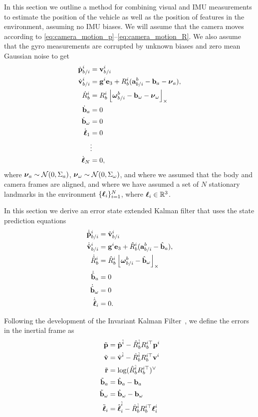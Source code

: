 In this section we outline a method for combining visual and IMU measurements to estimate the position of the vehicle as well as the position of features in the environment, assuming no IMU biases.  We will assume that the camera moves according to \eqref{eq:camera_motion_p}--\eqref{eq:camera_motion_R}.  We also assume that the gyro measurements are corrupted by unknown biases and zero mean Gaussian noise to get
\begin{align*}
\dot{\mathbf{p}}_{b/i}^i &= \mathbf{v}_{b/i}^i   \\
\dot{\mathbf{v}}_{b/i}^i &= \mathbf{g}^i \mathbf{e}_3 + R_b^i (\mathbf{a}_{b/i}^b-\mathbf{b}_a - \boldsymbol{\nu}_a),  \\
\dot{R}_b^i &= R_b^i \left\lfloor\boldsymbol{\omega}_{b/i}^b-\mathbf{b}_\omega - \boldsymbol{\nu}_\omega\right\rfloor_{\times} \\
\dot{\mathbf{b}}_a &= 0 \\
\dot{\mathbf{b}}_\omega &= 0 \\
\dot{\boldsymbol{\ell}}_1 &= 0 \\
&\vdots \\ 
\dot{\boldsymbol{\ell}}_N &= 0,
\end{align*}
where $\boldsymbol{\nu}_a\sim\mathcal{N}(0, \Sigma_a)$, $\boldsymbol{\nu}_\omega\sim\mathcal{N}(0, \Sigma_\omega)$, and
where we assumed that the body and camera frames are aligned, and where we have assumed a set of $N$ stationary landmarks in the environment $\{\boldsymbol{\ell}_i\}_{i=1}^N$, where $\boldsymbol{\ell}_i\in\mathbb{R}^3$.

In this section we derive an error state extended Kalman filter that uses the state prediction equations
\begin{align*}
\dot{\hat{\mathbf{p}}}_{b/i}^i &= \hat{\mathbf{v}}_{b/i}^i   \\
\dot{\hat{\mathbf{v}}}_{b/i}^i &= \mathbf{g}^i \mathbf{e}_3 + \hat{R}_b^i (\mathbf{a}_{b/i}^b -\hat{\mathbf{b}}_a),  \\
\dot{\hat{R}}_b^i &= \hat{R}_b^i \left\lfloor\boldsymbol{\omega}_{b/i}^b-\hat{\mathbf{b}}_\omega\right\rfloor_{\times} \\
\dot{\hat{\mathbf{b}}}_a &= 0 \\
\dot{\hat{\mathbf{b}}}_\omega &= 0 \\
\dot{\hat{\boldsymbol{\ell}}}_i &= 0.
\end{align*}

Following the development of the Invariant Kalman Filter~\cite{}, we define the errors in the inertial frame as
\begin{align*}
    \tilde{\mathbf{p}} &= \hat{\mathbf{p}}^{\hat{i}}-\hat{R}_b^{\hat{i}}R_b^{i\top} \mathbf{p}^i \\
    \tilde{\mathbf{v}} &= \hat{\mathbf{v}}^{\hat{i}}-\hat{R}_b^{\hat{i}}R_b^{i\top} \mathbf{v}^i \\
    \tilde{\mathbf{r}} &= \log(\hat{R}_b^{\hat{i}} R_b^{i\top})^\vee \\
    \tilde{\mathbf{b}}_a &= \hat{\mathbf{b}}_a - \mathbf{b}_a \\
	\tilde{\mathbf{b}}_\omega &= \hat{\mathbf{b}}_\omega - \mathbf{b}_\omega \\
    \tilde{\boldsymbol{\ell}}_i &= \hat{\boldsymbol{\ell}}_i^{\hat{i}}-\hat{R}_b^{\hat{i}}R_b^{i\top} \boldsymbol{\ell}_i^i
\end{align*}

